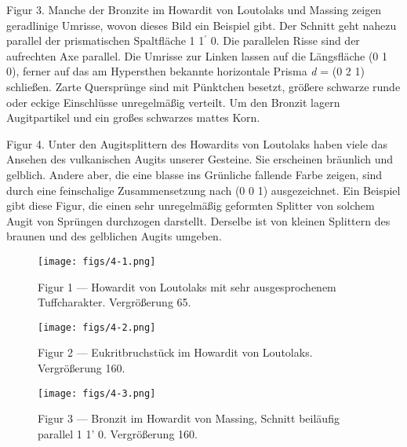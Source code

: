 \documentclass[a4paper, 11pt, oneside, polutonikogreek, german]{article}
\begin{document}
Figur 3. Manche der Bronzite im Howardit von Loutolaks und Massing zeigen geradlinige Umrisse, wovon dieses Bild ein Beispiel gibt. Der Schnitt geht nahezu parallel der prismatischen Spaltfläche 1 1$^{\prime}$ 0. Die parallelen Risse sind der aufrechten Axe parallel. Die Umrisse zur Linken lassen auf die Längsfläche (0 1 0), ferner auf das am Hypersthen bekannte horizontale Prisma \emph{d} = (0 2 1) schließen. Zarte Quersprünge sind mit Pünktchen besetzt, größere schwarze runde oder eckige Einschlüsse unregelmäßig verteilt. Um den Bronzit lagern Augitpartikel und ein großes schwarzes mattes Korn.

Figur 4. Unter den Augitsplittern des Howardits von Loutolaks haben viele das Ansehen des vulkanischen Augits unserer Gesteine. Sie erscheinen bräunlich und gelblich. Andere aber, die eine blasse ins Grünliche fallende Farbe zeigen, sind durch eine feinschalige Zusammensetzung nach (0 0 1) ausgezeichnet. Ein Beispiel gibt diese Figur, die einen sehr unregelmäßig geformten Splitter von solchem Augit von Sprüngen durchzogen darstellt. Derselbe ist von kleinen Splittern des braunen und des gelblichen Augits umgeben.
\clearpage

\vspace*{\fill}
\begin{figure}[H]
\centering
\texttt{[image: figs/4-1.png]}
\caption{\small Figur 1 --- Howardit von Loutolaks mit sehr ausgesprochenem Tuffcharakter. Vergrößerung 65.}
\end{figure}
\vspace*{\fill}
\clearpage

\vspace*{\fill}
\begin{figure}[H]
\centering
\texttt{[image: figs/4-2.png]}
\caption{\small Figur 2 --- Eukritbruchstück im Howardit von Loutolaks. Vergrößerung 160.}
\end{figure}
\vspace*{\fill}
\clearpage

\vspace*{\fill}
\begin{figure}[H]
\centering
\texttt{[image: figs/4-3.png]}
\caption{\small Figur 3 --- Bronzit im Howardit von Massing, Schnitt beiläufig parallel 1 1' 0. Vergrößerung 160.}
\end{figure}
\vspace*{\fill}
\clearpage
\end{document}
